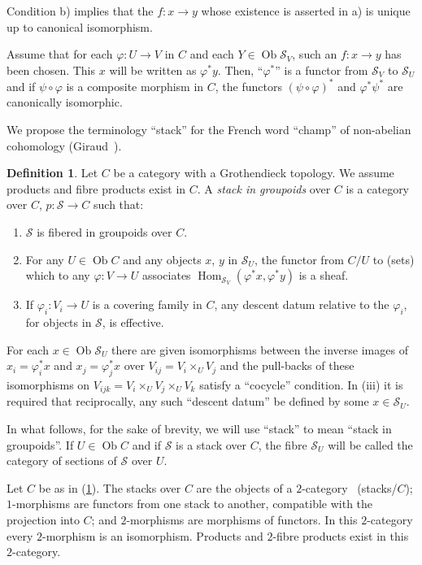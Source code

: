 \documentclass[10pt]{amsart}
\theoremstyle{plain}
\theoremstyle{definition}
\newtheorem{definition}[theorem]{Definition}
\DeclareMathOperator{\Hom}{Hom}
\DeclareMathOperator{\Ob}{Ob}
\begin{document}
Condition b) implies that the $f: x \to y$ whose existence is asserted in a) is unique up to canonical isomorphism.

Assume that for each $\varphi: U \to V$ in $C$ and each $Y \in \Ob \mathscr{S}_V$, such an $f: x \to y$ has been chosen. This $x$ will be written as $\varphi^* y$. Then, ``$\varphi^*$'' is a functor from $\mathscr{S}_V$ to $\mathscr{S}_U$ and if $\psi \circ \varphi$ is a composite morphism in $C$, the functors $(\psi \circ \varphi)^*$ and $\varphi^* \psi^*$ are canonically isomorphic.

We propose the terminology ``stack'' for the French word ``champ'' of non-abelian cohomology (Giraud~\cite{G}).

\begin{definition}\label{def:4.1}
Let $C$ be a category with a Grothendieck topology. We assume products and fibre products exist in $C$. A \emph{stack in groupoids} over $C$ is a category over $C$, $p: \mathscr{S} \to C$ such that:
\begin{enumerate}
\item[(i)] $\mathscr{S}$ is fibered in groupoids over $C$.
\item[(ii)] For any $U \in \Ob C$ and any objects $x$, $y$ in $\mathscr{S}_U$, the functor from $C/U$ to (sets) which to any $\varphi: V \to U$ associates $\Hom_{\mathscr{S}_V}(\varphi^* x, \varphi^* y)$ is a sheaf.
\item[(iii)] If $\varphi_i: V_i \to U$ is a covering family in $C$, any descent datum relative to the $\varphi_i$, for objects in $\mathscr{S}$, is effective.
\end{enumerate}
\end{definition}

For each $x \in \Ob \mathscr{S}_U$ there are given isomorphisms between the inverse images of $x_i = \varphi_i^* x$ and $x_j = \varphi_j^* x$ over $V_{ij} = V_i \times_U V_j$ and the pull-backs of these isomorphisms on $V_{ijk} = V_i \times_U V_j \times_U V_k$ satisfy a ``cocycle'' condition. In (iii) it is required that reciprocally, any such ``descent datum'' be defined by some $x \in \mathscr{S}_U$.

In what follows, for the sake of brevity, we will use ``stack'' to mean ``stack in groupoids''. If $U \in \Ob C$ and if $\mathscr{S}$ is a stack over $C$, the fibre $\mathscr{S}_U$ will be called the category of sections of $\mathscr{S}$ over $U$.

Let $C$ be as in (\ref{def:4.1}). The stacks over $C$ are the objects of a $2$-category~\cite{B} (stacks/$C$); $1$-morphisms are functors from one stack to another, compatible with the projection into $C$; and $2$-morphisms are morphisms of functors. In this $2$-category every $2$-morphism is an isomorphism. Products and $2$-fibre products exist in this $2$-category.
\end{document}
